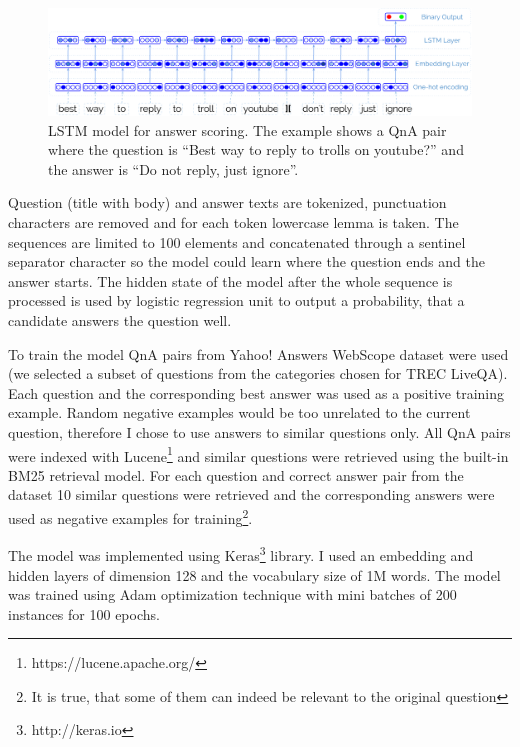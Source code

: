 \begin{figure}
	\includegraphics[width=\textwidth]{img/liveqa_qa_lstm}
	\caption{LSTM model for answer scoring. The example shows a QnA pair where the question is ``Best way to reply to trolls on youtube?'' and the answer is ``Do not reply, just ignore''.}
	\label{figure:non-factoid:liveqa:lstm_model}
\end{figure}

Question (title with body) and answer texts are tokenized, punctuation characters are removed and for each token lowercase lemma is taken.
The sequences are limited to 100 elements and concatenated through a sentinel separator character so the model could learn where the question ends and the answer starts.
The hidden state of the model after the whole sequence is processed is used by logistic regression unit to output a probability, that a candidate answers the question well.

To train the model QnA pairs from Yahoo! Answers WebScope dataset were used (we selected a subset of questions from the categories chosen for TREC LiveQA).
Each question and the corresponding best answer was used as a positive training example.
Random negative examples would be too unrelated to the current question, therefore I chose to use answers to similar questions only.
All QnA pairs were indexed with Lucene\footnote{https://lucene.apache.org/} and similar questions were retrieved using the built-in BM25 retrieval model.
For each question and correct answer pair from the dataset 10 similar questions were retrieved and the corresponding answers were used as negative examples for training\footnote{It is true, that some of them can indeed be relevant to the original question}.

The model was implemented using Keras\footnote{http://keras.io} library.
I used an embedding and hidden layers of dimension 128 and the vocabulary size of 1M words.
The model was trained using Adam optimization technique \cite{kingma2014adam} with mini batches of 200 instances for 100 epochs.

